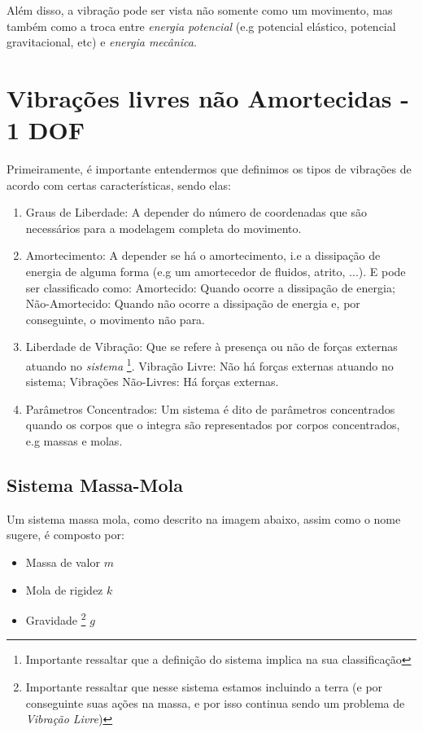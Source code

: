 \documentclass{article}
\begin{document}
            Além disso, a vibração pode ser vista não somente como um movimento, mas também como a troca entre \emph{energia potencial} (e.g potencial elástico, potencial gravitacional, etc) e
            \emph{energia mecânica}.

    \section{Vibrações livres não Amortecidas - 1 DOF}

            Primeiramente, é importante entendermos que definimos os tipos de vibrações de acordo com certas características, sendo elas:
            \begin{enumerate}
                \item Graus de Liberdade: A depender do número de coordenadas que são necessários para a modelagem completa do movimento.
                \item Amortecimento: A depender se há o amortecimento, i.e a dissipação de energia de alguma forma (e.g um amortecedor de fluidos, atrito, ...). E pode ser classificado como:
                    \subitem Amortecido: Quando ocorre a dissipação de energia;
                    \subitem Não-Amortecido: Quando não ocorre a dissipação de energia e, por conseguinte, o movimento não para.

                \item Liberdade de Vibração: Que se refere à presença ou não de forças externas atuando no \emph{sistema} \footnote{Importante ressaltar que a definição do sistema implica na sua classificação}.
                    \subitem Vibração Livre: Não há forças externas atuando no sistema;
                    \subitem Vibrações Não-Livres: Há forças externas.

                \item Parâmetros Concentrados: Um sistema é dito de parâmetros concentrados quando os corpos que o integra são representados por corpos concentrados, e.g massas e molas.
            \end{enumerate}


            \subsection{Sistema Massa-Mola}

                Um sistema massa mola, como descrito na imagem abaixo, assim como o nome sugere, é composto por:
                \begin{itemize}
                    \item Massa  de valor $m$
                    \item Mola de rigidez $k$
                    \item Gravidade \footnote{Importante ressaltar que nesse sistema estamos incluindo a terra (e por conseguinte suas ações na massa, e por isso continua sendo um problema de
                    \emph{Vibração Livre})} $g$
                \end{itemize}
\end{document}
